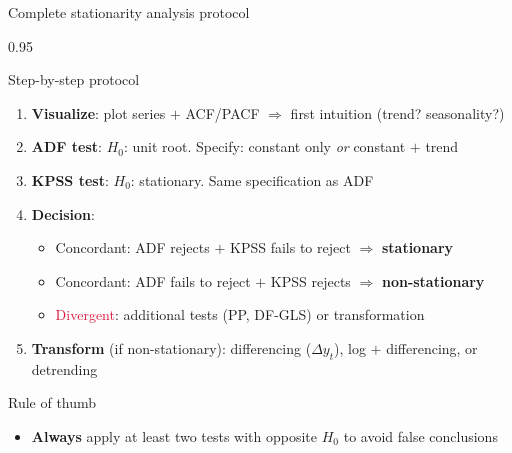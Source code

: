 \documentclass[9pt, aspectratio=169, t]{beamer}
\begin{document}
\begin{frame}{Complete stationarity analysis protocol}
    \begin{cminipage}{0.95\textwidth}
        \vspace{-0.2cm}
        {\footnotesize
        \begin{block}{Step-by-step protocol}
            \begin{enumerate}\setlength{\itemsep}{2pt}
                \item[\textcolor{MainBlue}{\textbf{1.}}] \textbf{Visualize}: plot series $+$ ACF/PACF $\Rightarrow$ first intuition (trend? seasonality?)
                \item[\textcolor{MainBlue}{\textbf{2.}}] \textbf{ADF test}: $H_0$: unit root. Specify: constant only \textit{or} constant $+$ trend
                \item[\textcolor{MainBlue}{\textbf{3.}}] \textbf{KPSS test}: $H_0$: stationary. Same specification as ADF
                \item[\textcolor{MainBlue}{\textbf{4.}}] \textbf{Decision}:
                    \begin{itemize}\setlength{\itemsep}{0pt}
                        \item \textcolor{Forest}{Concordant}: ADF rejects $+$ KPSS fails to reject $\Rightarrow$ \textbf{stationary}
                        \item \textcolor{Forest}{Concordant}: ADF fails to reject $+$ KPSS rejects $\Rightarrow$ \textbf{non-stationary}
                        \item \textcolor{Crimson}{Divergent}: additional tests (PP, DF-GLS) or transformation
                    \end{itemize}
                \item[\textcolor{MainBlue}{\textbf{5.}}] \textbf{Transform} (if non-stationary): differencing ($\Delta y_t$), log $+$ differencing, or detrending
            \end{enumerate}
        \end{block}
        \vspace{0.1cm}
        \begin{alertblock}{Rule of thumb}
            \begin{itemize}\setlength{\itemsep}{0pt}
                \item \textbf{Always} apply at least two tests with opposite $H_0$ to avoid false conclusions
            \end{itemize}
        \end{alertblock}
        }
    \end{cminipage}
\end{frame}
\end{document}

